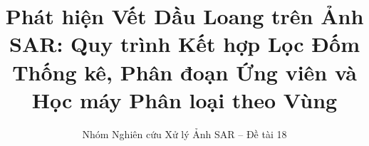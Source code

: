 \documentclass[preprint,12pt]{elsarticle}
\begin{document}
\begin{frontmatter}

\title{Phát hiện Vết Dầu Loang trên Ảnh SAR: Quy trình Kết hợp Lọc Đốm Thống kê, Phân đoạn Ứng viên và Học máy Phân loại theo Vùng}

\author[utc]{Nhóm Nghiên cứu Xử lý Ảnh SAR -- Đề tài 18}
\address[utc]{Trường Đại học Giao thông Vận tải (UTC), Hà Nội, Việt Nam}



\end{frontmatter}















\end{document}
